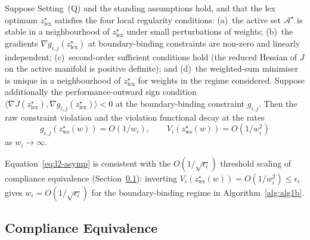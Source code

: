 \begin{proposition}
\label{prop:l2-asymptotic}
Suppose Setting~(Q) and the standing assumptions hold, and that the lex optimum $z_{\mathrm{lex}}^{\star}$ satisfies the four local regularity conditions: (a)~the active set $\mathcal{A}^{\star}$ is stable in a neighbourhood of $z_{\mathrm{lex}}^{\star}$ under small perturbations of weights; (b)~the gradients $\nabla g_{i, j}(z_{\mathrm{lex}}^{\star})$ at boundary-binding constraints are non-zero and linearly independent; (c)~second-order sufficient conditions hold (the reduced Hessian of $J$ on the active manifold is positive definite); and (d)~the weighted-sum minimiser is unique in a neighbourhood of $z_{\mathrm{lex}}^{\star}$ for weights in the regime considered. Suppose additionally the performance-outward sign condition $\langle \nabla J(z_{\mathrm{lex}}^{\star}), \nabla g_{i, j}(z_{\mathrm{lex}}^{\star}) \rangle < 0$ at the boundary-binding constraint $g_{i, j}$. Then the raw constraint violation and the violation functional decay at the rates
\begin{equation}
    g_{i, j}(z_{\mathrm{ws}}^{\star}(w)) = O(1/w_i), \qquad V_i(z_{\mathrm{ws}}^{\star}(w)) = O(1/w_i^2)
    \label{eq:l2-asymp}
\end{equation}
as $w_i \to \infty$.
\end{proposition}

Equation~\eqref{eq:l2-asymp} is consistent with the $O(1/\sqrt{\epsilon_i})$ threshold scaling of compliance equivalence (Section~\ref{sec:foundations:compliance}): inverting $V_i(z_{\mathrm{ws}}^{\star}(w)) = O(1/w_i^2) \leq \epsilon_i$ gives $w_i = O(1/\sqrt{\epsilon_i})$ for the boundary-binding regime in Algorithm~\ref{alg:alg1b}.

\subsection{Compliance Equivalence}
\label{sec:foundations:compliance}

